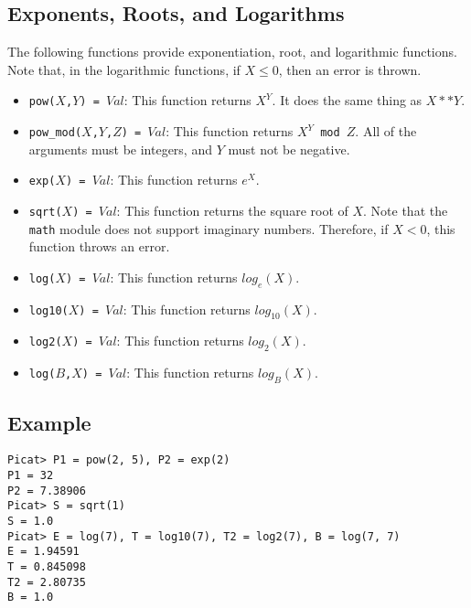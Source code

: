 \subsection{Exponents, Roots, and Logarithms}
The following functions provide exponentiation, root, and logarithmic functions.  Note that, in the logarithmic functions, if $X \le 0$, then an error is thrown.
\begin{itemize}
\item \texttt{pow($X$,$Y$) = $Val$}:  This function returns $X^Y$.  It does the same thing as $X ** Y$.
\item \texttt{pow\_mod($X$,$Y$,$Z$) = $Val$}:  This function returns \texttt{$X^Y$ mod $Z$}.  All of the arguments must be integers, and $Y$ must not be negative.
\item \texttt{exp($X$) = $Val$}:  This function returns $e^X$.
\item \texttt{sqrt($X$) = $Val$}: This function returns the square root of $X$.  Note that the \texttt{math} module does not support imaginary numbers.  Therefore, if $X < 0$, this function throws an error.
\item \texttt{log($X$) = $Val$}: This function returns $log_e(X)$.
\item \texttt{log10($X$) = $Val$}: This function returns $log_{10}(X)$.
\item \texttt{log2($X$) = $Val$}: This function returns $log_2(X)$.
\item \texttt{log($B$,$X$) = $Val$}:  This function returns $log_B(X)$.
\end{itemize}

\subsection*{Example}
\begin{verbatim}
Picat> P1 = pow(2, 5), P2 = exp(2)
P1 = 32
P2 = 7.38906
Picat> S = sqrt(1)
S = 1.0
Picat> E = log(7), T = log10(7), T2 = log2(7), B = log(7, 7)
E = 1.94591
T = 0.845098
T2 = 2.80735
B = 1.0
\end{verbatim}

